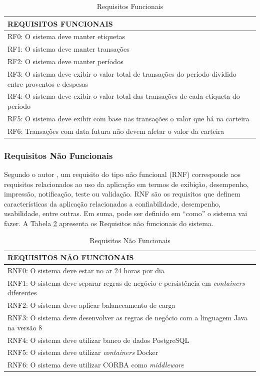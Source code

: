 \begin{table}[h]
	\caption{Requisitos Funcionais}
	\label{Req-Func}
	\begin{tabular}{|l|}
		\hline
		\textbf{REQUISITOS FUNCIONAIS} \\ \hline
		RF0: O sistema deve manter etiquetas \\ \hline
		RF1: O sistema deve manter transações \\ \hline
		RF2: O sistema deve manter períodos \\ \hline
		RF3: O sistema deve exibir o valor total de transações do período dividido entre proventos e despesas \\
		\hline
		RF4: O sistema deve exibir o valor total das transações de cada etiqueta do período \\ \hline
		RF5: O sistema deve exibir com base nas transações o valor que há na carteira \\ \hline
		RF6: Transações com data futura não devem afetar o valor da carteira \\ \hline
	\end{tabular}
\end{table}

\subsubsection{Requisitos Não Funcionais}
Segundo o autor \cite{Pfleeger}, um requisito do tipo não funcional (RNF) corresponde aos requisitos relacionados ao uso da aplicação em termos de exibição, desempenho, impressão, notificação, teste ou validação. RNF são os requisitos que definem características da aplicação relacionadas a confiabilidade, desempenho, usabilidade, entre outras. Em suma, pode ser definido em “como” o sistema vai fazer. A Tabela \ref{Req-Nao-Func} apresenta os Requisitos não funcionais do sistema.

\begin{table}[!h]
	\caption{Requisitos Não Funcionais}
	\label{Req-Nao-Func}
	\begin{tabular}{|l|}
		\hline
		\textbf{REQUISITOS NÃO FUNCIONAIS} \\ \hline
		RNF0: O sistema deve estar no ar 24 horas por dia \\ \hline
		RNF1: O sistema deve separar regras de negócio e persistência em \textit{containers} diferentes \\ \hline
		RNF2: O sistema deve aplicar balanceamento de carga \\ \hline
		RNF3: O sistema deve desenvolver as regras de negócio com a linguagem Java na versão 8\\ \hline
		RNF4: O sistema deve utilizar banco de dados PostgreSQL \\ \hline
		RNF5: O sistema deve utilizar \textit{containers} Docker \\ \hline
		RNF6: O sistema deve utilizar CORBA como \textit{middleware} \\ \hline
	\end{tabular}
\end{table}


